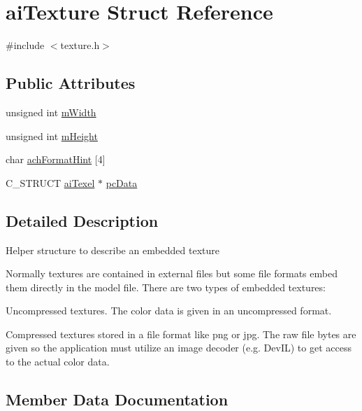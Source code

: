 \hypertarget{structai_texture}{}\section{ai\+Texture Struct Reference}
\label{structai_texture}


{\ttfamily \#include $<$texture.\+h$>$}

\subsection*{Public Attributes}
\begin{DoxyCompactItemize}
\item 
unsigned int \hyperlink{structai_texture_aaa3ad8cfe44fdc4dea2db91977d92234}{m\+Width}
\item 
unsigned int \hyperlink{structai_texture_ac1e2fa6f1f646e9c55e3985d4418a752}{m\+Height}
\item 
char \hyperlink{structai_texture_aa9f44996acf3b301bfeb4e5348311540}{ach\+Format\+Hint} \mbox{[}4\mbox{]}
\item 
C\+\_\+\+S\+T\+R\+U\+CT \hyperlink{structai_texel}{ai\+Texel} $\ast$ \hyperlink{structai_texture_aeb07528748b6e49d2d81c60006024f9a}{pc\+Data}
\end{DoxyCompactItemize}


\subsection{Detailed Description}
Helper structure to describe an embedded texture

Normally textures are contained in external files but some file formats embed them directly in the model file. There are two types of embedded textures\+:
\begin{DoxyEnumerate}
\item Uncompressed textures. The color data is given in an uncompressed format.
\item Compressed textures stored in a file format like png or jpg. The raw file bytes are given so the application must utilize an image decoder (e.\+g. Dev\+IL) to get access to the actual color data. 
\end{DoxyEnumerate}

\subsection{Member Data Documentation}

